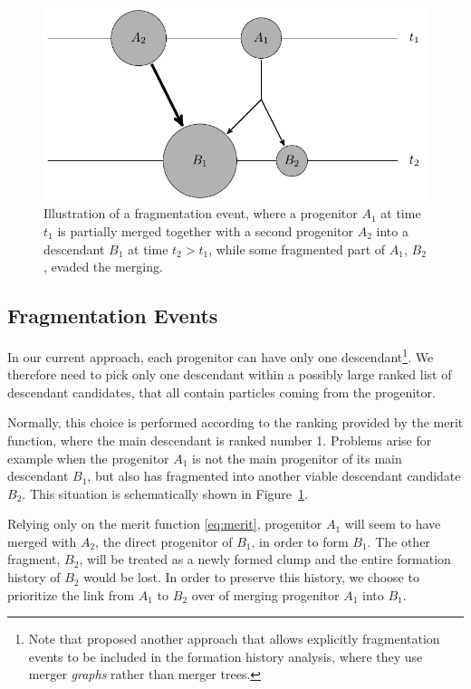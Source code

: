 \begin{figure}
  \centering
  \includegraphics[width=.9\linewidth]{./images/tikz/fracture.pdf}
  \caption{Illustration of a fragmentation event, where a
  	progenitor $A_1$ at time $t_1$ is partially merged together
  	with a second progenitor $A_2$ into a descendant $B_1$ at
  	time $t_2 > t_1$, while some fragmented part of $A_1$, $B_2$,
  	evaded the merging.
	}
  \label{fig:fracture}
\end{figure}

\subsection{Fragmentation Events}
\label{sect:frag}

In our current approach, each progenitor can have only one
descendant\footnote{Note that \cite{springelSimulatingCosmicStructure2021a}
proposed another approach that allows explicitly fragmentation
events to be included in the formation history analysis, where they use
merger \emph{graphs} rather than merger trees.}. We therefore need
to pick only one descendant within a possibly large ranked list of
descendant candidates, that all contain particles coming from the
progenitor.

Normally, this choice is performed according to the ranking provided
by the merit function, where the main descendant is ranked number 1.
Problems arise for example when the progenitor $A_1$ is not the main
progenitor of its main descendant $B_1$, but also has fragmented into
another viable descendant candidate $B_2$.  This situation is
schematically shown in Figure~\ref{fig:fracture}.

Relying only on the merit function \eqref{eq:merit}, progenitor $A_1$
will seem to have merged with $A_2$, the direct progenitor of $B_1$,
in order to form $B_1$.  The other fragment, $B_2$, will be treated as
a newly formed clump and the entire formation history of $B_2$ would
be lost. In order to preserve this history, we choose to prioritize the
link from $A_1$ to $B_2$ over of merging progenitor $A_1$ into $B_1$.


